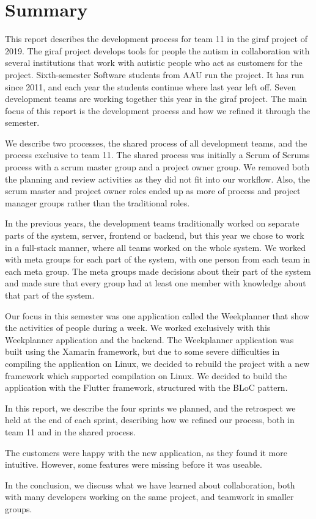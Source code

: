 \section{Summary}

This report describes the development process for team 11 in the \gls{giraf} project of 2019. The \gls{giraf} project develops tools for people the autism in collaboration with several institutions that work with autistic people who act as customers for the project. Sixth-semester Software students from AAU run the project. It has run since 2011, and each year the students continue where last year left off. Seven development teams are working together this year in the \gls{giraf} project. The main focus of this report is the development process and how we refined it through the semester.

We describe two processes, the shared process of all development teams, and the process exclusive to team 11. The shared process was initially a Scrum of Scrums process with a scrum master group and a project owner group. We removed both the planning and review activities as they did not fit into our workflow. Also, the scrum master and project owner roles ended up as more of process and project manager groups rather than the traditional roles. 

In the previous years, the development teams traditionally worked on separate parts of the system, server, frontend or backend, but this year we chose to work in a full-stack manner, where all teams worked on the whole system. We worked with meta groups for each part of the system, with one person from each team in each meta group. The meta groups made decisions about their part of the system and made sure that every group had at least one member with knowledge about that part of the system. 

Our focus in this semester was one application called the Weekplanner that show the activities of people during a week. We worked exclusively with this Weekplanner application and the backend. The Weekplanner application was built using the Xamarin framework, but due to some severe difficulties in compiling the application on Linux, we decided to rebuild the project with a new framework which supported compilation on Linux. We decided to build the application with the Flutter framework, structured with the BLoC pattern. 

In this report, we describe the four sprints we planned, and the retrospect we held at the end of each sprint, describing how we refined our process, both in team 11 and in the shared process.

The customers were happy with the new application, as they found it more intuitive. However, some features were missing before it was useable. 

In the conclusion, we discuss what we have learned about collaboration, both with many developers working on the same project, and teamwork in smaller groups. 
